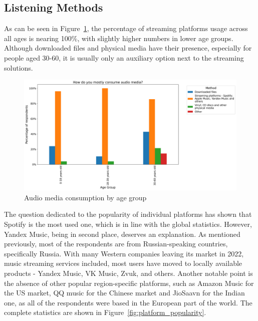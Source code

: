 \subsection{Listening Methods}
As can be seen in Figure~\ref{fig:consumption_methods}, the percentage of streaming platforms
usage across all ages is nearing 100\%, with slightly higher numbers in lower age groups.
Although downloaded files and physical media have their presence,
especially for people aged 30-60, it is usually only an auxiliary option next to the streaming solutions.

\begin{figure}[htbp]
    \centering
    \includegraphics[height=0.4\textheight]{charts/constumption_method.png}
    \caption{Audio media consumption by age group}
    \label{fig:consumption_methods}
\end{figure}

The question dedicated to the popularity of individual platforms has shown that Spotify is the most used one,
which is in line with the global statistics\cite{spotifypopularity}.
However, Yandex Music, being in second place, deserves an explanation.
As mentioned previously, most of the respondents are from Russian-speaking countries, specifically Russia.
With many Western companies leaving its market in 2022, music streaming services included, most users have
moved to locally available products - Yandex Music, VK Music, Zvuk, and others.
Another notable point is the absence of other popular region-specific platforms, such as Amazon Music for the US market,
QQ music for the Chinese market and JioSaavn for the Indian one,
as all of the respondents were based in the European part of the world.
The complete statistics are shown in Figure~\ref{fig:platform_popularity}.

